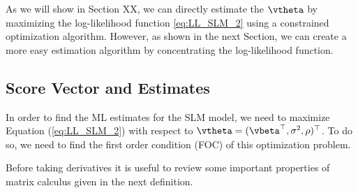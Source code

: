 \documentclass[english,12pt]{book}\usepackage[]{graphicx}\usepackage[]{xcolor}
\begin{document}
As we will show in Section XX, we can directly estimate the $\vtheta$ by maximizing the log-likelihood function \eqref{eq:LL_SLM_2} using a constrained optimization algorithm. However, as shown in the next Section, we can create a more easy estimation algorithm by concentrating the log-likelihood function. 

\subsection{Score Vector and Estimates}\label{sec:score_sml}

In order to find the ML estimates for the SLM model, we need to maximize Equation (\ref{eq:LL_SLM_2}) with respect to $\vtheta = (\vbeta^\top, \sigma^2 , \rho)^\top$. To do so, we need to find the first order condition (FOC) of this optimization problem. 

Before taking derivatives it is useful to review some important properties of matrix calculus given in the next definition. 
\end{document}
